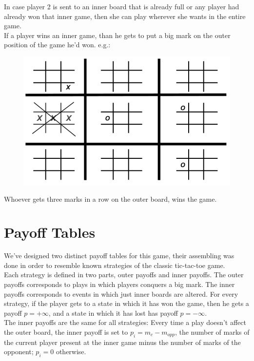 \documentclass[10pt]{article}
\begin{document}
In case player 2 is sent to an inner board that is already full or any player had already won that inner game, then she can play wherever she wants in the entire game.\\
If a player wins an inner game, than he gets to put a big mark on the outer position of the game he'd won. e.g.:

\begin{figure}[h]
\centering
\includegraphics[scale=0.3]{img/ultimate4.png}
\end{figure}

Whoever gets three marks in a row on the outer board, wins the game.\\

\section{Payoff Tables}
We've designed two distinct payoff tables for this game, their assembling was done in order to resemble known strategies of the classic tic-tac-toe game.\\

Each strategy is defined in two parts, outer payoffs and inner payoffs. The outer payoffs corresponds to plays in which players conquers a big mark. The inner payoffs corresponds to events in which just inner boards are altered. For every strategy, if the player gets to a state in which it has won the game, then he gets a payoff $p = +\infty$, and a state in which it has lost has payoff $p = -\infty$.\\

The inner payoffs are the same for all strategies: Every time a play doesn't affect the outer board, the inner payoff is set to $p_i = m_c - m_{opp}$, the number of marks of the current player present at the inner game minus the number of marks of the opponent; $p_i = 0$ otherwise. 
\end{document}
